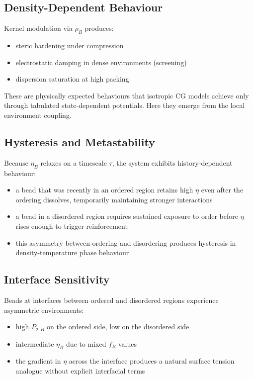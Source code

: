 \documentclass[11pt]{article}
\begin{document}
\subsection{Density-Dependent Behaviour}

Kernel modulation via $\rho_B$ produces:
\begin{itemize}
    \item steric hardening under compression
    \item electrostatic damping in dense environments (screening)
    \item dispersion saturation at high packing
\end{itemize}

These are physically expected behaviours that isotropic CG models achieve
only through tabulated state-dependent potentials.  Here they emerge from
the local environment coupling.

\subsection{Hysteresis and Metastability}

Because $\eta_B$ relaxes on a timescale $\tau$, the system exhibits
history-dependent behaviour:
\begin{itemize}
    \item a bead that was recently in an ordered region retains high $\eta$
          even after the ordering dissolves, temporarily maintaining
          stronger interactions
    \item a bead in a disordered region requires sustained exposure to
          order before $\eta$ rises enough to trigger reinforcement
    \item this asymmetry between ordering and disordering produces
          hysteresis in density-temperature phase behaviour
\end{itemize}

\subsection{Interface Sensitivity}

Beads at interfaces between ordered and disordered regions experience
asymmetric environments:
\begin{itemize}
    \item high $P_{2,B}$ on the ordered side, low on the disordered side
    \item intermediate $\eta_B$ due to mixed $f_B$ values
    \item the gradient in $\eta$ across the interface produces a natural
          surface tension analogue without explicit interfacial terms
\end{itemize}
\end{document}
